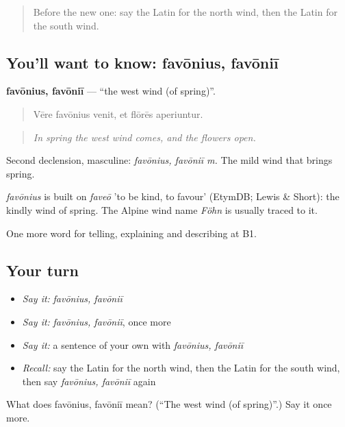 \begin{quote}
Before the new one: say the Latin for the north wind, then the Latin for the south wind.
\end{quote}

\subsection*{You'll want to know: favōnius, favōniī}
\textbf{favōnius, favōniī} — \textquotedblleft{}the west wind (of spring)\textquotedblright{}.

\begin{quote}
Vēre favōnius venit, et flōrēs aperiuntur.
\end{quote}

\begin{quote}
\emph{In spring the west wind comes, and the flowers open.}
\end{quote}

Second declension, masculine: \emph{favōnius, favōniī m.} The mild wind that brings spring.

\begin{cousinweb}
\emph{favōnius} is built on \emph{faveō} 'to be kind, to favour' (EtymDB; Lewis \& Short): the kindly wind of spring. The Alpine wind name \emph{Föhn} is usually traced to it.
\end{cousinweb}

\begin{grammarlens}[title={What you've built}]
One more word for telling, explaining and describing at B1.
\end{grammarlens}

\subsection*{Your turn}
\begin{itemize}
\raggedright
  \item \emph{Say it:} \emph{favōnius, favōniī}
  \item \emph{Say it:} \emph{favōnius, favōniī}, once more
  \item \emph{Say it:} a sentence of your own with \emph{favōnius, favōniī}
  \item \emph{Recall:} say the Latin for the north wind, then the Latin for the south wind, then say \emph{favōnius, favōniī} again
\end{itemize}

\begin{tcolorbox}[breakable,colback=teal!4,colframe=teal!35!black,title={Before you move on}]
What does favōnius, favōniī mean? (\textquotedblleft{}The west wind (of spring)\textquotedblright{}.) Say it once more.
\end{tcolorbox}
